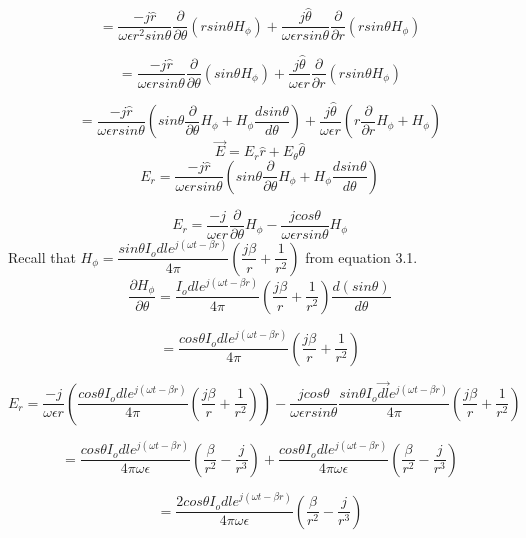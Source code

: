 	$$ = \dfrac{-j \hat{r}}{\omega \epsilon r^2 sin\theta}\dfrac{\partial}{\partial \theta}(rsin\theta H_{\phi}) + \dfrac{j \hat{\theta}}{\omega  \epsilon r sin\theta}\dfrac{\partial}{\partial r}(rsin\theta H_{\phi})$$ 
	
	$$ = \dfrac{-j \hat{r}}{\omega  \epsilon r sin\theta}\dfrac{\partial}{\partial \theta}(sin\theta H_{\phi}) + \dfrac{j \hat{\theta}}{\omega  \epsilon r}\dfrac{\partial}{\partial r}(rsin\theta H_{\phi}) $$
	
	$$ = \dfrac{-j \hat{r}}{\omega \epsilon r sin\theta}\left(sin\theta\dfrac{\partial }{\partial \theta}H_{\phi} + H_{\phi}\dfrac{d sin\theta}{d\theta}\right) + \dfrac{j\hat{\theta}}{\omega \epsilon r}\left(r\dfrac{\partial}{\partial r}H_{\phi} + H_{\phi}\right)$$
	\smallskip
	$$\vec{E} = E_r\hat{r} + E_{\theta}\hat{\theta}$$
	\smallskip
	$$E_r = \dfrac{-j \hat{r}}{\omega \epsilon r sin\theta}\left(sin\theta\dfrac{\partial }{\partial \theta}H_{\phi} + H_{\phi}\dfrac{d sin\theta}{d\theta}\right)$$
	
	$$E_r = \dfrac{-j}{\omega \epsilon r}\dfrac{\partial}{\partial \theta}H_{\phi} - \dfrac{j cos\theta}{\omega \epsilon rsin\theta}H_\phi$$
	\smallskip
	Recall that $H_{\phi} = \dfrac{sin\theta I_o dl e^{j(\omega t-\beta r)} }{4\pi} \left(\dfrac{j\beta}{r} + \dfrac{1}{r^2}\right)$ from equation 3.1.
	\smallskip
	$$\dfrac{\partial H_{\phi}}{\partial \theta} =  \dfrac{I_o dl e^{j(\omega t-\beta r)} }{4\pi} (\dfrac{j\beta}{r} + \dfrac{1}{r^2})\dfrac{d (sin\theta)}{d \theta}$$
	
	$$ = \dfrac{cos \theta I_o dl e^{j(\omega t-\beta r)} }{4\pi} \left(\dfrac{j\beta}{r} + \dfrac{1}{r^2}\right)$$
	 
	\begin{dmath*}
		E_r =  \dfrac{-j}{\omega \epsilon r}\left(\dfrac{cos \theta I_o dl e^{j(\omega t-\beta r)} }{4\pi} \left(\dfrac{j\beta}{r} + \dfrac{1}{r^2}\right)\right) -  \dfrac{j cos\theta}{\omega \epsilon rsin\theta}\dfrac{sin\theta I_o\vec{dl} e^{j(\omega t-\beta r)} }{4\pi} \left(\dfrac{j\beta}{r} + \dfrac{1}{r^2}\right)
	\end{dmath*}
	
	$$ = \dfrac{cos \theta I_o dl e^{j(\omega t-\beta r)} }{4\pi \omega  \epsilon} \left(\dfrac{\beta}{r^2} - \dfrac{j}{r^3}\right) + \dfrac{cos \theta I_o dl e^{j(\omega t-\beta r)} }{4\pi \omega \epsilon} \left(\dfrac{\beta}{r^2} - \dfrac{j}{r^3}\right) $$
	
	$$ = \dfrac{2 cos \theta I_o dl e^{j(\omega t-\beta r)} }{4\pi \omega\epsilon} \left(\dfrac{\beta}{r^2} - \dfrac{j}{r^3}\right) $$
	 
